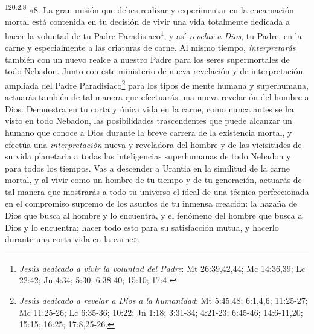 \par 
\textsuperscript{120:2.8} «8. La gran misión que debes realizar y experimentar en la encarnación mortal está contenida en tu decisión de vivir una vida totalmente dedicada a hacer la voluntad de tu Padre Paradisiaco\footnote{\textit{Jesús dedicado a vivir la voluntad del Padre}: Mt 26:39,42,44; Mc 14:36,39; Lc 22:42; Jn 4:34; 5:30; 6:38-40; 15:10; 17:4.}, y así \textit{revelar a Dios}, tu Padre, en la carne y especialmente a las criaturas de carne. Al mismo tiempo, \textit{interpretarás} también con un nuevo realce a nuestro Padre para los seres supermortales de todo Nebadon. Junto con este ministerio de nueva revelación y de interpretación ampliada del Padre Paradisiaco\footnote{\textit{Jesús dedicado a revelar a Dios a la humanidad}: Mt 5:45,48; 6:1,4,6; 11:25-27; Mc 11:25-26; Lc 6:35-36; 10:22; Jn 1:18; 3:31-34; 4:21-23; 6:45-46; 14:6-11,20; 15:15; 16:25; 17:8,25-26.} para los tipos de mente humana y superhumana, actuarás también de tal manera que efectuarás una nueva revelación del hombre a Dios. Demuestra en tu corta y única vida en la carne, como nunca antes se ha visto en todo Nebadon, las posibilidades trascendentes que puede alcanzar un humano que conoce a Dios durante la breve carrera de la existencia mortal, y efectúa una \textit{interpretación} nueva y reveladora del hombre y de las vicisitudes de su vida planetaria a todas las inteligencias superhumanas de todo Nebadon y para todos los tiempos. Vas a descender a Urantia en la similitud de la carne mortal, y al vivir como un hombre de tu tiempo y de tu generación, actuarás de tal manera que mostrarás a todo tu universo el ideal de una técnica perfeccionada en el compromiso supremo de los asuntos de tu inmensa creación: la hazaña de Dios que busca al hombre y lo encuentra, y el fenómeno del hombre que busca a Dios y lo encuentra; hacer todo esto para su satisfacción mutua, y hacerlo durante una corta vida en la carne».

